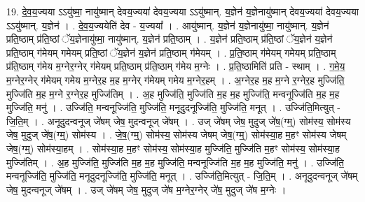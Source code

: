 \documentclass[17pt]{extarticle}
\begin{document}
19. दे॒व॒य॒ज्यया ऽऽयु॑ष्मा॒ नायु॑ष्मान् देवय॒ज्यया॑ देवय॒ज्यया ऽऽयु॑ष्मान्. य॒ज्ञेन॑ य॒ज्ञेनायु॑ष्मान् देवय॒ज्यया॑ देवय॒ज्यया ऽऽयु॑ष्मान्. य॒ज्ञेन॑ । . दे॒व॒य॒ज्ययेति॑ देव - य॒ज्यया᳚ । . आयु॑ष्मान्. य॒ज्ञेन॑ य॒ज्ञेनायु॑ष्मा॒ नायु॑ष्मान्. य॒ज्ञेन॑ प्रति॒ष्ठाम् प्र॑ति॒ष्ठां ॅय॒ज्ञेनायु॑ष्मा॒ नायु॑ष्मान्. य॒ज्ञेन॑ प्रति॒ष्ठाम् । . य॒ज्ञेन॑ प्रति॒ष्ठाम् प्र॑ति॒ष्ठां ॅय॒ज्ञेन॑ य॒ज्ञेन॑ प्रति॒ष्ठाम् ग॑मेयम् गमेयम् प्रति॒ष्ठां ॅय॒ज्ञेन॑ य॒ज्ञेन॑ प्रति॒ष्ठाम् ग॑मेयम् । . प्र॒ति॒ष्ठाम् ग॑मेयम् गमेयम् प्रति॒ष्ठाम् प्र॑ति॒ष्ठाम् ग॑मेय म॒ग्नेर॒ग्नेर् ग॑मेयम् प्रति॒ष्ठाम् प्र॑ति॒ष्ठाम् ग॑मेय म॒ग्नेः । . प्र॒ति॒ष्ठामिति॑ प्रति - स्थाम् । . ग॒मे॒य॒ म॒ग्नेर॒ग्नेर् ग॑मेयम् गमेय म॒ग्नेर॒ह म॒ह म॒ग्नेर् ग॑मेयम् गमेय म॒ग्नेर॒हम् । . अ॒ग्नेर॒ह म॒ह म॒ग्ने र॒ग्नेर॒ह मुज्जि॑ति॒ मुज्जि॑ति म॒ह म॒ग्ने र॒ग्नेर॒ह मुज्जि॑तिम् । . अ॒ह मुज्जि॑ति॒ मुज्जि॑ति म॒ह म॒ह मुज्जि॑ति॒ मन्वनूज्जि॑ति म॒ह म॒ह मुज्जि॑ति॒ मनु॑ । . उज्जि॑ति॒ मन्वनूज्जि॑ति॒ मुज्जि॑ति॒ मनूदुदनूज्जि॑ति॒ मुज्जि॑ति॒ मनूत् । . उज्जि॑ति॒मित्युत् - जि॒ति॒म् । . अनूदुदन्वनूज् जे॑षम् जेष॒ मुदन्वनूज् जे॑षम् । . उज् जे॑षम् जेष॒ मुदुज् जे॑ष॒(ग्म्॒) सोम॑स्य॒ सोम॑स्य जेष॒ मुदुज् जे॑ष॒(ग्म्॒) सोम॑स्य । . जे॒ष॒(ग्म्॒) सोम॑स्य॒ सोम॑स्य जेषम् जेष॒(ग्म्॒) सोम॑स्या॒ह म॒हꣳ सोम॑स्य जेषम् जेष॒(ग्म्॒) सोम॑स्या॒हम् । . सोम॑स्या॒ह म॒हꣳ सोम॑स्य॒ सोम॑स्या॒ह मुज्जि॑ति॒ मुज्जि॑ति म॒हꣳ सोम॑स्य॒ सोम॑स्या॒ह मुज्जि॑तिम् । . अ॒ह मुज्जि॑ति॒ मुज्जि॑ति म॒ह म॒ह मुज्जि॑ति॒ मन्वनूज्जि॑ति म॒ह म॒ह मुज्जि॑ति॒ मनु॑ । . उज्जि॑ति॒ मन्वनूज्जि॑ति॒ मुज्जि॑ति॒ मनूदुदनूज्जि॑ति॒ मुज्जि॑ति॒ मनूत् । . उज्जि॑ति॒मित्युत् - जि॒ति॒म् । . अनूदुदन्वनूज् जे॑षम् जेष॒ मुदन्वनूज् जे॑षम् । . उज् जे॑षम् जेष॒ मुदुज् जे॑ष म॒ग्नेर॒ग्नेर् जे॑ष॒ मुदुज् जे॑ष म॒ग्नेः । \newline
\end{document}

